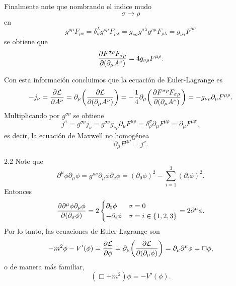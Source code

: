 \documentclass{article}
\begin{document}
Finalmente note que nombrando el indice mudo
\begin{equation}
\sigma\rightarrow\rho
\end{equation}
en
\begin{equation}
g^{\rho\mu}F_{\rho\nu}=\delta^\lambda_\nu g^{\rho\mu}F_{\rho\lambda}=g_{\nu\sigma}g^{\sigma\lambda}g^{\rho\mu}F_{\rho\lambda}=g_{\nu\sigma}F^{\mu\sigma}
\end{equation}
se obtiene que 
\begin{equation}\label{ec:momento}
\pdv{F^{\sigma\rho}F_{\sigma\rho}}{(\partial_\mu A^\nu)}=4g_{\nu\rho}F^{\mu\rho}.
\end{equation}

Con esta información concluimos que la ecuación de Euler-Lagrange es  
\begin{equation}
-j_\nu=\pdv{\mathcal{L}}{A^\nu}=\partial_\mu\qty(\pdv{\mathcal{L}}{(\partial_\mu A^\nu)})=-\frac{1}{4}\partial_\mu\qty(\pdv{F^{\sigma\rho}F_{\sigma\rho}}{(\partial_\mu A^\nu)})=-g_{\nu\rho}\partial_\mu F^{\mu\rho}.
\end{equation}
Multiplicando por $g^{\sigma\nu}$ se obtiene
\begin{equation}
j^\sigma=g^{\sigma\nu}j_\nu=g^{\sigma\nu}g_{\nu\rho}\partial_\mu F^{\mu\rho}=\delta^\sigma_\rho\partial_\mu F^{\mu\rho}=\partial_\mu F^{\mu \sigma},
\end{equation}
es decir, la ecuación de Maxwell no homogénea
\begin{equation}
\partial_\mu F^{\mu\nu}=j^{\nu}.
\end{equation}

2.2 Note que
\begin{equation}
\partial^\mu\phi\partial_\mu\phi=g^{\mu\nu}\partial_\mu\phi\partial_\nu\phi=(\partial_0\phi)^2-\sum_{i=1}^3(\partial_i\phi)^2.
\end{equation}
Entonces
\begin{equation}
\pdv{\partial^\mu\phi\partial_\mu\phi}{(\partial_\sigma\phi)}=2\begin{cases}
\partial_0\phi & \sigma=0\\
-\partial_i\phi & \sigma=i\in\{1,2,3\}
\end{cases}=2\partial^\mu\phi.
\end{equation}
Por lo tanto, las ecuaciones de Euler-Lagrange son
\begin{equation}
-m^2\phi-V'(\phi)=\pdv{\mathcal{L}}{\phi}=\partial_\mu\qty(\pdv{\mathcal{L}}{(\partial_\mu\phi)})=\partial_\mu\partial^\mu\phi=\Box\phi,
\end{equation}
o de manera más familiar,
\begin{equation}
(\Box+m^2)\phi=-V'(\phi).
\end{equation}
\end{document}
